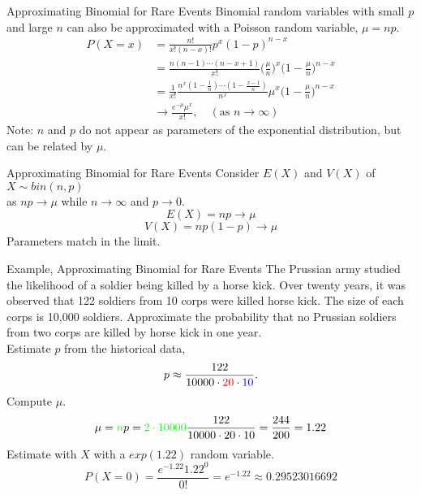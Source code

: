 \documentclass[]{beamer}
\newcommand{\blue}[1]{{\color{blue} #1}}
\newcommand{\red}[1]{{\color{red} #1}}
\newcommand{\grn}[1]{{\color{green} #1}}
\newcommand{\nl}[1]{\vspace{#1 em}}
\begin{document}
    \begin{frame}{Approximating Binomial for Rare Events}
            Binomial random variables with small $p$ and large $n$ can also be approximated with a Poisson random variable, $\mu = np$.
            \pause
            \begin{align*}
                P(X=x) &= \frac{n!}{x!(n-x)!} p^x(1-p)^{n-x}\\
                & = \frac{n(n-1)\cdots (n-x+1)}{x!} \bigg( \frac{\mu}{n} \bigg)^x\bigg( 1 - \frac{\mu}{n} \bigg)^{n-x}\\
                & = \frac{1}{x!}\frac{n^x(1-\frac{1}{n})\cdots(1-\frac{x-1}{n})}{n^x} \mu^x \bigg( 1 - \frac{\mu}{n} \bigg)^{n-x}\\
                & \to \frac{e^{-\mu}\mu^x}{x!}, \quad  (\text{as } n \to \infty)
            \end{align*}
            \pause Note: $n$ and $p$ do not appear as parameters of the exponential distribution, but can be related by $\mu$.
    \end{frame}

    \begin{frame}{Approximating Binomial for Rare Events}
        Consider $E(X)$ and $V(X)$ of $X\sim bin(n,p)$ \\
        as $np \to \mu$ while $n\to \infty$ and $p\to 0$.
        $$E(X) = np \to \mu $$
        $$V(X) = np(1-p) \to \mu $$
        Parameters match in the limit.
    \end{frame}

    \begin{frame}{Example, Approximating Binomial for Rare Events}
        The Prussian army studied the likelihood of a soldier being killed by a horse kick. Over \red{twenty} years, it was observed that 122 soldiers from \blue{10} corps were killed horse kick. The size of each corps is 10,000 soldiers. Approximate the probability that no Prussian soldiers from \grn{two corps} are killed by horse kick in one year.
        \\ \nl{0.5}
        \pause
        Estimate $p$ from the historical data,
        $$ p \approx \frac{122}{10000\cdot \red{20} \cdot \blue{10}}.$$
        Compute $\mu$.
        $$ \mu = \grn{n} p = \grn{2\cdot 10000} \frac{122}{10000 \cdot 20 \cdot 10} = \frac{244}{200} = 1.22$$
        Estimate with $X$ with a $exp(1.22)$ random variable.
        $$ P(X = 0) = \frac{e^{-1.22} 1.22^0}{0!} =e^{-1.22} \approx 0.29523016692 $$
    \end{frame}
\end{document}

